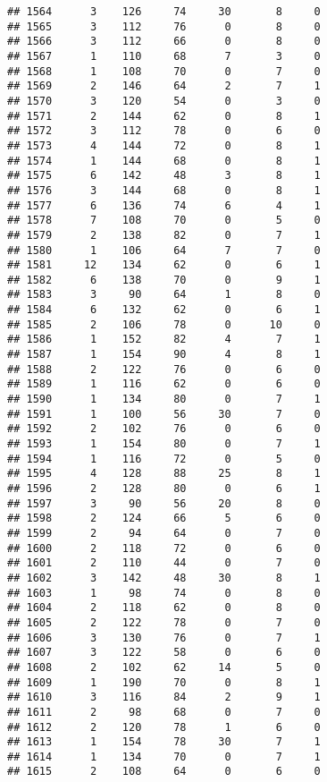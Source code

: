 \documentclass[
]{article}
\begin{document}
\begin{verbatim}
## 1564      3    126     74     30       8     0
## 1565      3    112     76      0       8     0
## 1566      3    112     66      0       8     0
## 1567      1    110     68      7       3     0
## 1568      1    108     70      0       7     0
## 1569      2    146     64      2       7     1
## 1570      3    120     54      0       3     0
## 1571      2    144     62      0       8     1
## 1572      3    112     78      0       6     0
## 1573      4    144     72      0       8     1
## 1574      1    144     68      0       8     1
## 1575      6    142     48      3       8     1
## 1576      3    144     68      0       8     1
## 1577      6    136     74      6       4     1
## 1578      7    108     70      0       5     0
## 1579      2    138     82      0       7     1
## 1580      1    106     64      7       7     0
## 1581     12    134     62      0       6     1
## 1582      6    138     70      0       9     1
## 1583      3     90     64      1       8     0
## 1584      6    132     62      0       6     1
## 1585      2    106     78      0      10     0
## 1586      1    152     82      4       7     1
## 1587      1    154     90      4       8     1
## 1588      2    122     76      0       6     0
## 1589      1    116     62      0       6     0
## 1590      1    134     80      0       7     1
## 1591      1    100     56     30       7     0
## 1592      2    102     76      0       6     0
## 1593      1    154     80      0       7     1
## 1594      1    116     72      0       5     0
## 1595      4    128     88     25       8     1
## 1596      2    128     80      0       6     1
## 1597      3     90     56     20       8     0
## 1598      2    124     66      5       6     0
## 1599      2     94     64      0       7     0
## 1600      2    118     72      0       6     0
## 1601      2    110     44      0       7     0
## 1602      3    142     48     30       8     1
## 1603      1     98     74      0       8     0
## 1604      2    118     62      0       8     0
## 1605      2    122     78      0       7     0
## 1606      3    130     76      0       7     1
## 1607      3    122     58      0       6     0
## 1608      2    102     62     14       5     0
## 1609      1    190     70      0       8     1
## 1610      3    116     84      2       9     1
## 1611      2     98     68      0       7     0
## 1612      2    120     78      1       6     0
## 1613      1    154     78     30       7     1
## 1614      1    134     70      0       7     1
## 1615      2    108     64      0       6     0

\end{verbatim}
\end{document}
